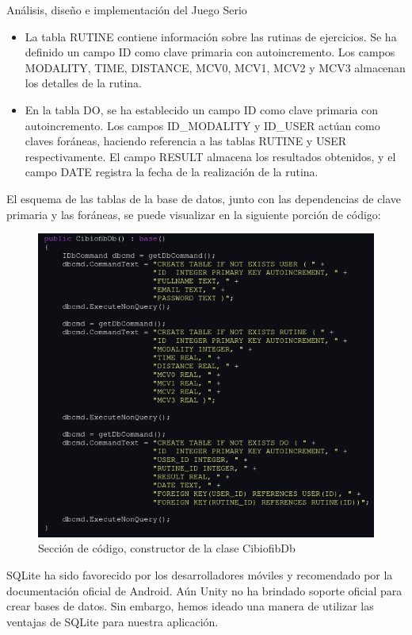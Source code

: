 \begin{thesischapter}{2} {Análisis, diseño e implementación del Juego Serio}
\begin{itemize}
        \item La tabla RUTINE contiene información sobre las rutinas de ejercicios. Se ha definido un campo ID como clave primaria con 
        autoincremento. Los campos MODALITY, TIME, DISTANCE, MCV0, MCV1, MCV2 y MCV3 almacenan los detalles de la rutina.
    
        \item En la tabla DO, se ha establecido un campo ID como clave primaria con autoincremento. Los campos ID\_MODALITY y ID\_USER actúan 
        como claves foráneas, haciendo referencia a las tablas RUTINE y USER respectivamente. El campo RESULT almacena los resultados obtenidos, 
        y el campo DATE registra la fecha de la realización de la rutina.
        
    \end{itemize}

    El esquema de las tablas de la base de datos, junto con las dependencias de clave primaria y las foráneas, se puede visualizar en la siguiente 
    porción de código:
    \begin{figure}[ht]
        \centering
        \includegraphics[scale=0.5]{images/database-code.png}
        \caption{Sección de código, constructor de la clase CibiofibDb}
        \label{fig: database-code}
    \end{figure}
    
    \vspace{10pt}
    SQLite ha sido favorecido por los desarrolladores móviles y recomendado por la documentación oficial de Android. Aún  
    Unity no ha brindado soporte oficial para crear bases de datos. Sin embargo, hemos ideado una manera de utilizar las 
    ventajas de SQLite para nuestra aplicación. 
    

\end{thesischapter}
